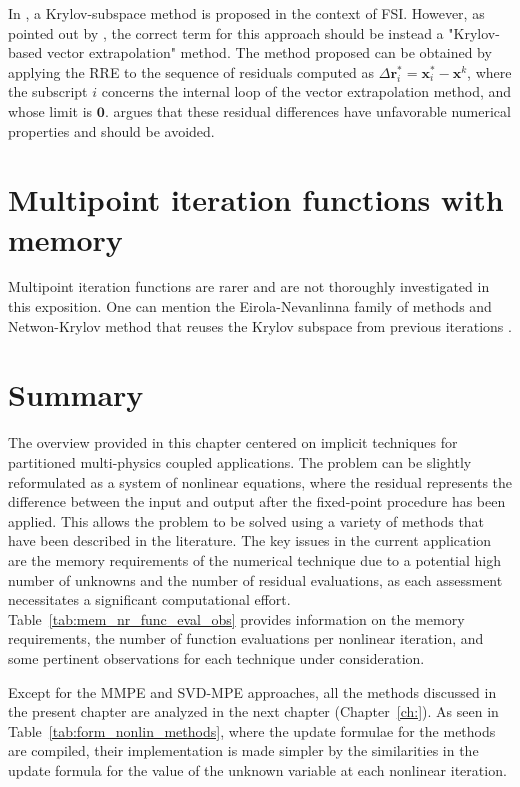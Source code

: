 In \cite{michler_interface_2005}, a Krylov-subspace method is proposed in the context of FSI.
However, as pointed out by \cite{kuttler_vector_2009}, the correct term for this approach should be instead a "Krylov-based vector extrapolation" method.
The method proposed can be obtained by applying the RRE to the sequence of residuals computed as
\(\Delta \mathbf r^*_i = \mathbf x^*_i - \mathbf x^k\), where the subscript \(i\) concerns the internal loop of the vector extrapolation method, and whose limit is \(\mathbf 0\).
\cite{kuttler_vector_2009} argues that these residual differences have unfavorable numerical properties and should be avoided.



\section{Multipoint iteration functions with memory}

Multipoint iteration functions are rarer and are not thoroughly investigated in this exposition.
One can mention the Eirola-Nevanlinna family of methods \citep{fang_two_2009} and Netwon-Krylov method that reuses the Krylov subspace from previous iterations \citep{sidi_vector_2017}.

\section{Summary}

The overview provided in this chapter centered on implicit techniques for partitioned multi-physics coupled applications.
The problem can be slightly reformulated as a system of nonlinear equations, where the residual represents the difference between the input and output after the fixed-point procedure has been applied. This allows the problem to be solved using a variety of methods that have been described in the literature.
The key issues in the current application are the memory requirements of the numerical technique due to a potential high number of unknowns and the number of residual evaluations, as each assessment necessitates a significant computational effort.
Table~\ref{tab:mem_nr_func_eval_obs} provides information on the memory requirements, the number of function evaluations per nonlinear iteration, and some pertinent observations for each technique under consideration.

Except for the MMPE and SVD-MPE approaches, all the methods discussed in the present chapter are analyzed in the next chapter (Chapter~\ref{ch:}).
As seen in Table~\ref{tab:form_nonlin_methods}, where the update formulae for the methods are compiled, their implementation is made simpler by the similarities in the update formula for the value of the unknown variable at each nonlinear iteration.


